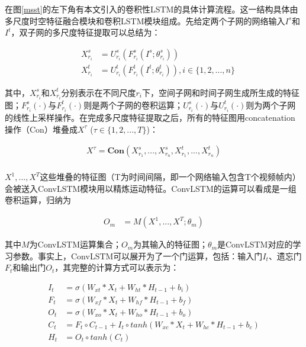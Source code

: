在图\ref{msst}的左下角有本文引入的卷积性LSTM的具体计算流程。这一结构具体由多尺度时空特征融合模块和卷积LSTM模块组成。先给定两个子网的网络输入$I^s$和$I^t$，双子网的多尺度特征提取可以总结为：

\begin{equation}
 \label{eq3_4}
 \begin{aligned}
 \quad X^{s}_{r_i} &=  U^{s}_{r_i}(F^{s}_{r_i}(I^s;\theta^{s}_{r_i})) \\
        \quad X^{t}_{r_i} &=  U^{t}_{r_i}(F^{t}_{r_i}(I^t;\theta^{t}_{r_i})), i \in \{1, 2, ..., n\}
 \end{aligned}
\end{equation}

其中，$X^{s}_{r_i}$和$X^{t}_{r_i}$分别表示在不同尺度$r_i$下，空间子网和时间子网生成所生成的特征图；$F^{s}_{r_i}(\cdot)$与$F^{t}_{r_i}(\cdot)$则是两个子网的卷积运算；$U^ {s}_{r_i}(\cdot)$与$U^{t}_{r_i}(\cdot)$则为两个子网的线性上采样操作。在完成多尺度特征提取之后，所有的特征图用concatenation操作（Con）堆叠成$X^\tau $ ($\tau  \in \{1, 2, ..., T\}$)：

\begin{equation}
 \label{eq3_3}
 \begin{aligned}
    X^\tau  = \textbf{Con}(X^{s}_{r_1}, ...,X^{s}_{r_n},X^{t}_{r_1}, ...,X^{t}_{r_n})\\
 \end{aligned}
\end{equation}

$X^1, ..., X^T$这些堆叠的特征图（T为时间间隔，即一个网络输入包含T个视频帧内）会被送入ConvLSTM模块用以精炼运动特征。ConvLSTM的运算可以看成是一组卷积运算，归纳为

\begin{equation}
\label{P_motion}
\begin{aligned}
   O_{m}  &= M(X^1, ..., X^T; \theta_m)
 \end{aligned}
\end{equation}

其中$M$为ConvLSTM运算集合；$O_{m}$为其输入的特征图；$\theta_m$是ConvLSTM对应的学习参数。事实上，ConvLSTM可以展开为了一个门运算，包括：输入门$I_t$、遗忘门$F_t$和输出门$O_t$，其完整的计算方式可以表示为：

\begin{equation}
\label{s_lstm}
\begin{aligned}
   I_{t}  &= \sigma(W_{xt} * X_t + W_{ht} * H_{t-1} + b_i) \\
   F_{t}  &= \sigma(W_{xf} * X_t + W_{hf} * H_{t-1} + b_f) \\
   O_{t}  &= \sigma(W_{xo} * X_t + W_{ho} * H_{t-1} + b_o) \\
   C_{t}  &= F_{t} \circ C_{t-1} + I_{t} \circ tanh(W_{xc}* X_t + W_{hc} * H_{t-1} + b_c) \\
   H_t &= O_t \circ tanh(C_t)
 \end{aligned}
\end{equation}

